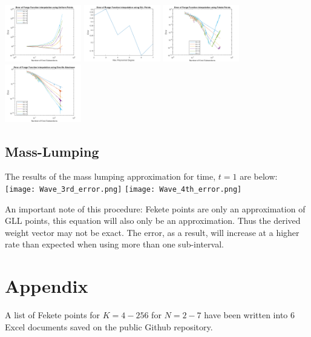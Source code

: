 \documentclass{article}
\begin{document}
\hspace*{-0.5cm}\includegraphics[height = 2.5cm]{RungeUniform.png} \includegraphics[height = 2.5cm]{RungeGLL.png}
\includegraphics[height = 2.5cm]{RungeFekete.png} \includegraphics[height = 2.5cm]{RungeGreville.png}

\subsection*{Mass-Lumping}
The results of the mass lumping approximation for time, $t=1$ are below:
\newline\hspace*{-0.5cm}
\texttt{[image: Wave\_3rd\_error.png]} \texttt{[image: Wave\_4th\_error.png]}

An important note of this procedure: Fekete points are only an approximation of GLL points, this equation will also only be an approximation. Thus the derived weight vector may not be exact. The error, as a result, will increase at a higher rate than expected when using more than one sub-interval.


\section*{Appendix}
A list of Fekete points for $K=4-256$ for $N=2-7$ have been written into 6 Excel documents saved on the public Github repository.
\end{document}
